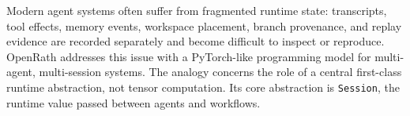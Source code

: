 

Modern agent systems often suffer from fragmented runtime state: transcripts, tool effects, memory events, workspace placement, branch provenance, and replay evidence are recorded separately and become difficult to inspect or reproduce. OpenRath addresses this issue with a PyTorch-like programming model for multi-agent, multi-session systems. The analogy concerns the role of a central first-class runtime abstraction, not tensor computation. Its core abstraction is \texttt{Session}, the runtime value passed between agents and workflows.

